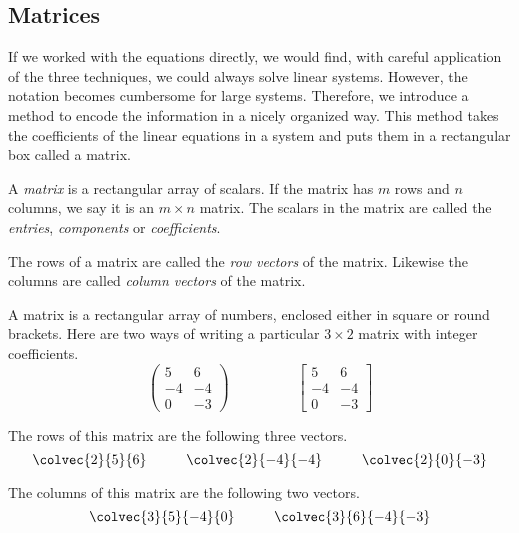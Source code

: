 \documentclass[fleqn]{report}
\begin{document}
\subsection{Matrices}
\label{matrices}

If we worked with the equations directly, we would find, with
careful application of the three techniques, we could always
solve linear systems. However, the notation becomes cumbersome
for large systems. Therefore, we introduce a method to encode the
information in a nicely organized way. This method takes the
coefficients of the linear equations in a system and puts them
in a rectangular box called a matrix. 

\begin{defn}
A \emph{matrix} is a rectangular array of scalars. If the
matrix has $m$ rows and $n$ columns, we say it is an $m \times
n$ matrix. The scalars in the matrix are called the
\emph{entries}, \emph{components} or \emph{coefficients}.
\end{defn}

\begin{defn}
The rows of a matrix are called the \emph{row
vectors} of the matrix. Likewise the columns are called
\emph{column vectors} of the matrix.
\end{defn}

A matrix is a rectangular array of numbers, enclosed 
either in square or round brackets. Here are two
ways of writing a particular $3\times 2$ matrix with integer
coefficients.
\begin{displaymath}
\left(
\begin{matrix}
5 & 6 \\
-4 & -4 \\
0 & -3 
\end{matrix}
\right)
\hspace{2cm}
\left[
\begin{matrix}
5 & 6 \\
-4 & -4 \\
0 & -3 
\end{matrix}
\right]
\end{displaymath}

The rows of this matrix are the following three vectors.
\begin{displaymath}
\colvec{2}{5}{6} \hspace{1cm} 
\colvec{2}{-4}{-4} \hspace{1cm}
\colvec{2}{0}{-3} 
\end{displaymath}

The columns of this matrix are the following two vectors.
\begin{displaymath}
\colvec{3}{5}{-4}{0} \hspace{1cm}
\colvec{3}{6}{-4}{-3}
\end{displaymath}
\end{document}
